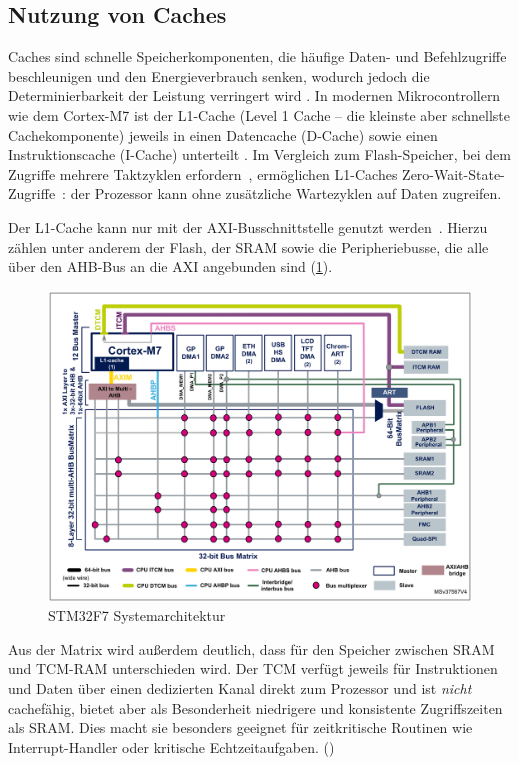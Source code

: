 \subsection{Nutzung von Caches}

Caches sind schnelle Speicherkomponenten, die häufige Daten- und Befehlzugriffe
beschleunigen und den Energieverbrauch senken, wodurch jedoch die
Determinierbarkeit der Leistung verringert wird \cite{ka001150}. In modernen
Mikrocontrollern wie dem Cortex-M7 ist der L1-Cache (Level 1 Cache -- die
kleinste aber schnellste Cachekomponente) jeweils in einen Datencache (D-Cache)
sowie einen Instruktionscache (I-Cache) unterteilt \cite[S. 6]{an4667}. Im
Vergleich zum Flash-Speicher, bei dem Zugriffe mehrere Taktzyklen
erfordern~\cite{stm32_memory_sections}, ermöglichen L1-Caches
Zero-Wait-State-Zugriffe~\cite[S. 6]{an4667}: der Prozessor kann ohne
zusätzliche Wartezyklen auf Daten zugreifen.

Der L1-Cache kann nur mit der \ac{AXI}-Busschnittstelle genutzt werden~\cite[S.
4]{an4839}. Hierzu zählen unter anderem der Flash, der \ac{SRAM} sowie die
Peripheriebusse, die alle über den \ac{AHB}-Bus an die AXI angebunden sind
(\ref{fig:m7_sys_arch}).

\begin{figure}[htb]
    \centering
    \includegraphics[width=1\textwidth]{assets/m7_system_arch}
    \caption{STM32F7 Systemarchitektur \cite[S. 9]{an4667}}
    \label{fig:m7_sys_arch}
\end{figure}

Aus der Matrix wird außerdem deutlich, dass für den Speicher zwischen SRAM und
TCM-RAM unterschieden wird. Der \ac{TCM} verfügt jeweils für Instruktionen und
Daten über einen dedizierten Kanal direkt zum Prozessor und ist \textit{nicht}
cachefähig, bietet aber als Besonderheit niedrigere und konsistente
Zugriffszeiten als SRAM. Dies macht sie besonders geeignet für zeitkritische
Routinen wie Interrupt-Handler oder kritische Echtzeitaufgaben.
(\cite{arm_den0042})

